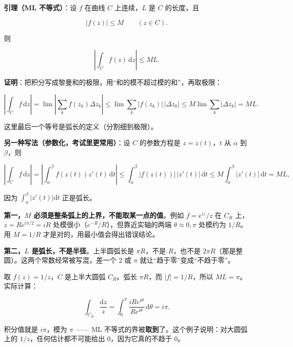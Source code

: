 \documentclass[11pt]{ctexart}
\let\origsubhdr\subhdr
\renewcommand{\subhdr}[1]{\par\needspace{4\baselineskip}\origsubhdr{#1}}
\let\orighdr\hdr
\renewcommand{\hdr}[2]{\par\orighdr{#1}{#2}}
\begin{document}


\textbf{引理（ML 不等式）}：设 $f$ 在曲线 $C$ 上连续，$L$ 是 $C$ 的长度，且

$$
|f(z)|\le M\qquad(z\in C).
$$

则

$$
\left|\int_C f(z)\,\mathrm{d}z\right|\le ML .
$$

\textbf{证明}：把积分写成黎曼和的极限，用“和的模不超过模的和”，再取极限：

$$
\left|\int_C f\,\mathrm{d}z\right|
=\lim\left|\sum_k f(z_k)\Delta z_k\right|
\le\lim\sum_k |f(z_k)|\,|\Delta z_k|
\le M\lim\sum_k|\Delta z_k|
= M L .
$$

这里最后一个等号是弧长的定义（分割细到极限）。

\textbf{另一种写法（参数化，考试里更常用）}：设 $C$ 的参数方程是 $z=z(t)$，$t$ 从 $\alpha$ 到 $\beta$，则

$$
\left|\int_C f\,\mathrm{d}z\right|
=\left|\int_\alpha^\beta f(z(t))z'(t)\,\mathrm{d}t\right|
\le\int_\alpha^\beta |f(z(t))|\,|z'(t)|\,\mathrm{d}t
\le M\int_\alpha^\beta|z'(t)|\,\mathrm{d}t=ML ,
$$

因为 $\int_\alpha^\beta|z'(t)|\mathrm{d}t$ 正是弧长。


\textbf{第一，$M$ 必须是整条弧上的上界，不能取某一点的值}。例如 $f=e^{iz}/z$ 在 $C_R$ 上，$z=Re^{i\pi/2}=iR$ 处模很小（$e^{-R}/R$），但靠近实轴的两端 $\theta\approx0,\pi$ 处模约为 $1/R$。用 $M=1/R$ 才是对的，用最小值会得出错误结论。

\textbf{第二，$L$ 是弧长，不是半径}。上半圆弧长是 $\pi R$，不是 $R$，也不是 $2\pi R$（那是整圆）。这两个常数经常被写混，差一个 $2$ 或 $\pi$ 就让“趋于零”变成“不趋于零”。


取 $f(z)=1/z$，$C$ 是上半大圆弧 $C_R$。弧长 $\pi R$，而 $|f|=1/R$，所以 $ML=\pi$。实际计算：

$$
\int_{C_R}\frac{\mathrm{d}z}{z}
=\int_0^{\pi}\frac{iRe^{i\theta}}{Re^{i\theta}}\,\mathrm{d}\theta
=i\pi .
$$

积分值就是 $i\pi$，模为 $\pi$ —— ML 不等式的界被\textbf{取到}了。这个例子说明：对大圆弧上的 $1/z$，任何估计都不可能给出 0，因为它真的不趋于 0。


\end{document}
